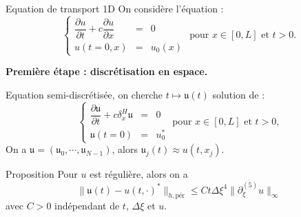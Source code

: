 \documentclass[11pt]{beamer}
\begin{document}
\begin{frame}{Equation de transport 1D}
On considère l'équation :
$$
\left\lbrace
\begin{array}{rcl}
\dfrac{\partial u}{\partial t} + c \dfrac{\partial u}{\partial x} & = & 0 \\
u(t=0,x) & = & u_0(x)
\end{array}
\right. \text{ pour } x \in [0,L] \text{ et } t>0.
$$
\begin{block}{}
\textbf{Première étape : discrétisation en espace.}
\end{block}
Equation semi-discrétisée, on cherche $t \mapsto \mathfrak{u}(t)$ solution de :
$$
\left\lbrace
\begin{array}{rcl}
\dfrac{\partial \mathfrak{u}}{\partial t} + c \delta_x^H \mathfrak{u} & = & 0 \\
\mathfrak{u}(t=0) & = & u_0^*
\end{array}
\right. \text{ pour } x \in [0,L] \text{ et } t>0,
$$
On a $\mathfrak{u} = (\mathfrak{u}_0, \cdots , \mathfrak{u}_{N-1})$, alors $\mathfrak{u}_j(t) \approx u(t, x_j)$.
\end{frame}













\begin{frame}{}
\begin{block}{Proposition}
Pour $u$ est régulière, alors on a
$$
\| \mathfrak{u}(t) - u(t,\cdot)^* \|_{h,\text{pér}} \leq C t \Delta \xi^4 \| \partial_{\xi}^{(5)}u \|_{\infty}
$$
avec $C>0$ indépendant de $t$, $\Delta \xi$ et $u$.
\end{block}
\end{frame}
\end{document}
